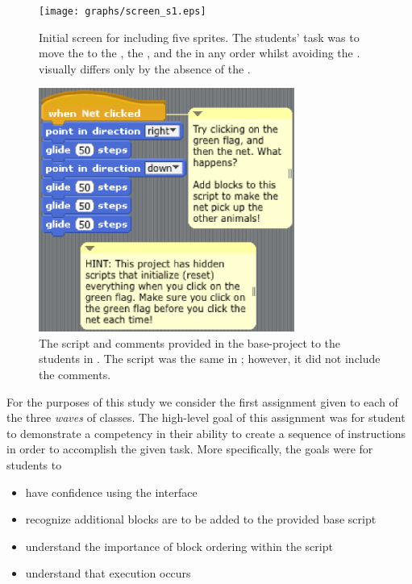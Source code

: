 \begin{figure}[!t]
\centering \texttt{[image: graphs/screen\_s1.eps]}
\caption{Initial screen for \sone{} including five sprites. The students' task
  was to move the \net{} to \catch{} the \bear{}, the \horse{}, and the
  \zebra{} in any order whilst avoiding the \snake{}. \stwo{} visually differs
  only by the absence of the \snake{}.}
\end{figure}


\begin{figure}[!t]
\centering \includegraphics[width=3.3in]{graphs/screen_blocks.eps}
\caption{The script and comments provided in the base-project to the students
  in \stwo{}. The script was the same in \sone{}; however, it did not include
  the comments.}
\end{figure}


For the purposes of this study we consider the first assignment given to each
of the three \emph{waves} of classes. The high-level goal of this assignment
was for student to demonstrate a competency in their ability to create a
sequence of instructions in order to accomplish the given task. More
specifically, the goals were for students to

\begin{itemize}
\item have confidence using the interface
\item recognize additional blocks are to be added to the provided base script
\item understand the importance of block ordering within the script
\item understand that execution occurs \netclicked{}
\end{itemize}

